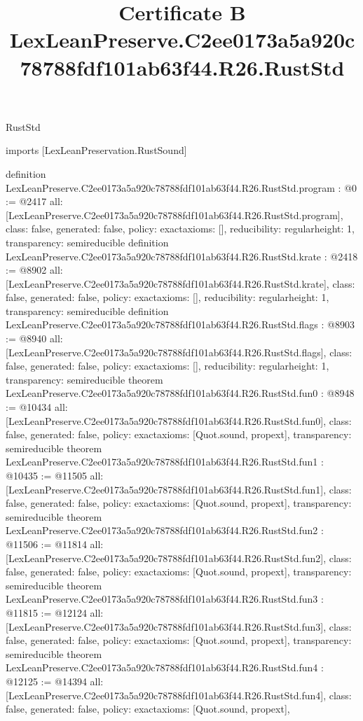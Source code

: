 \begin{lexlean}{RustStd}
\title{Certificate B LexLeanPreserve.C2ee0173a5a920c78788fdf101ab63f44.R26.RustStd}
\begin{coremodule}
imports [LexLeanPreservation.RustSound]

definition LexLeanPreserve.C2ee0173a5a920c78788fdf101ab63f44.R26.RustStd.program : @0 := @2417 {
  all: [LexLeanPreserve.C2ee0173a5a920c78788fdf101ab63f44.R26.RustStd.program],
  class: false,
  generated: false,
  policy: exact{axioms: []},
  reducibility: regular{height: 1},
  transparency: semireducible
}
definition LexLeanPreserve.C2ee0173a5a920c78788fdf101ab63f44.R26.RustStd.krate : @2418 := @8902 {
  all: [LexLeanPreserve.C2ee0173a5a920c78788fdf101ab63f44.R26.RustStd.krate],
  class: false,
  generated: false,
  policy: exact{axioms: []},
  reducibility: regular{height: 1},
  transparency: semireducible
}
definition LexLeanPreserve.C2ee0173a5a920c78788fdf101ab63f44.R26.RustStd.flags : @8903 := @8940 {
  all: [LexLeanPreserve.C2ee0173a5a920c78788fdf101ab63f44.R26.RustStd.flags],
  class: false,
  generated: false,
  policy: exact{axioms: []},
  reducibility: regular{height: 1},
  transparency: semireducible
}
theorem LexLeanPreserve.C2ee0173a5a920c78788fdf101ab63f44.R26.RustStd.fun0 : @8948 := @10434 {
  all: [LexLeanPreserve.C2ee0173a5a920c78788fdf101ab63f44.R26.RustStd.fun0],
  class: false,
  generated: false,
  policy: exact{axioms: [Quot.sound, propext]},
  transparency: semireducible
}
theorem LexLeanPreserve.C2ee0173a5a920c78788fdf101ab63f44.R26.RustStd.fun1 : @10435 := @11505 {
  all: [LexLeanPreserve.C2ee0173a5a920c78788fdf101ab63f44.R26.RustStd.fun1],
  class: false,
  generated: false,
  policy: exact{axioms: [Quot.sound, propext]},
  transparency: semireducible
}
theorem LexLeanPreserve.C2ee0173a5a920c78788fdf101ab63f44.R26.RustStd.fun2 : @11506 := @11814 {
  all: [LexLeanPreserve.C2ee0173a5a920c78788fdf101ab63f44.R26.RustStd.fun2],
  class: false,
  generated: false,
  policy: exact{axioms: [Quot.sound, propext]},
  transparency: semireducible
}
theorem LexLeanPreserve.C2ee0173a5a920c78788fdf101ab63f44.R26.RustStd.fun3 : @11815 := @12124 {
  all: [LexLeanPreserve.C2ee0173a5a920c78788fdf101ab63f44.R26.RustStd.fun3],
  class: false,
  generated: false,
  policy: exact{axioms: [Quot.sound, propext]},
  transparency: semireducible
}
theorem LexLeanPreserve.C2ee0173a5a920c78788fdf101ab63f44.R26.RustStd.fun4 : @12125 := @14394 {
  all: [LexLeanPreserve.C2ee0173a5a920c78788fdf101ab63f44.R26.RustStd.fun4],
  class: false,
  generated: false,
  policy: exact{axioms: [Quot.sound, propext]},
}
\end{coremodule}
\end{lexlean}
